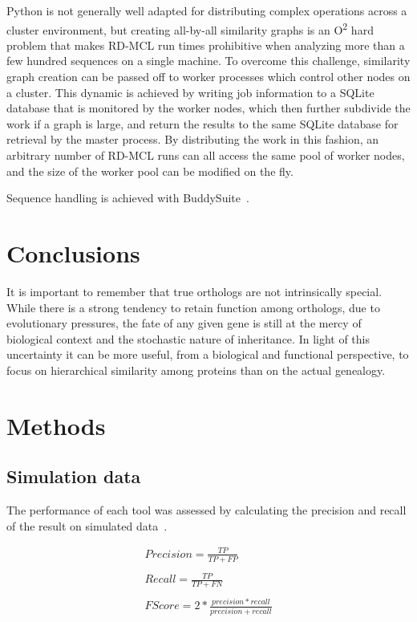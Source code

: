 \documentclass[twocolumn]{bmcart}%
\begin{document}
Python is not generally well adapted for distributing complex operations across a cluster environment, but creating all-by-all similarity graphs is an O\textsuperscript{2} hard problem that makes RD-MCL run times prohibitive when analyzing more than a few hundred sequences on a single machine.
To overcome this challenge, similarity graph creation can be passed off to worker processes which control other nodes on a cluster.
This dynamic is achieved by writing job information to a SQLite database that is monitored by the worker nodes, which then further subdivide the work if a graph is large, and return the results to the same SQLite database for retrieval by the master process.
By distributing the work in this fashion, an arbitrary number of RD-MCL runs can all access the same pool of worker nodes, and the size of the worker pool can be modified on the fly.

Sequence handling is achieved with BuddySuite~\cite{Bond:2017bj}.

\section{Conclusions}\label{sec:conclusions}
It is important to remember that true orthologs are not intrinsically special.
While there is a strong tendency to retain function among orthologs, due to evolutionary pressures, the fate of any given gene is still at the mercy of biological context and the stochastic nature of inheritance.
In light of this uncertainty it can be more useful, from a biological and functional perspective, to focus on hierarchical similarity among proteins than on the actual genealogy.

\section{Methods}\label{sec:methods}
\subsection{Simulation data}\label{subsec:simulationData}
The performance of each tool was assessed by calculating the precision and recall of the result on simulated data~\cite{Emms:2015ig}.

\begin{gather*}
    Precision = \frac{TP}{TP + FP}\\
    \\
    Recall = \frac{TP}{TP + FN}\\
    \\
    F Score = 2 * \frac{precision * recall}{precision + recall}\\
\end{gather*}
\end{document}
